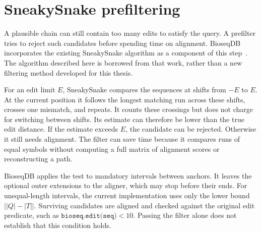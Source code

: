 \clearpage
\section{SneakySnake prefiltering}
\label{sec:prefilter-role}
\label{sec:prefilter-sneakysnake}

A plausible chain can still contain too many edits to satisfy the query.
A prefilter tries to reject such candidates before spending time on alignment.
BioseqDB incorporates the existing SneakySnake algorithm as a component of
this step~\cite{sneakysnake_paper}. The algorithm described here is borrowed
from that work, rather than a new filtering method developed for this thesis.

For an edit limit \(E\), SneakySnake compares the sequences at shifts from
\(-E\) to \(E\). At the current position it follows the longest matching
run across these shifts, crosses one mismatch, and repeats. It counts these
crossings but does not charge for switching between shifts. Its estimate can
therefore be lower than the true edit distance. If the estimate exceeds
\(E\), the candidate can be rejected. Otherwise it still needs alignment.
The filter can save time because it compares runs of equal symbols without
computing a full matrix of alignment scores or reconstructing a path.

BioseqDB applies the test to mandatory intervals between anchors. It leaves
the optional outer extensions to the aligner, which may stop before their
ends. For unequal-length intervals, the current implementation uses only the
lower bound \(\bigl||Q|-|T|\bigr|\). Surviving candidates are aligned and
checked against the original edit predicate, such as
\(\texttt{bioseq.edit(seq)}<10\). Passing the filter alone does not establish
that this condition holds.

